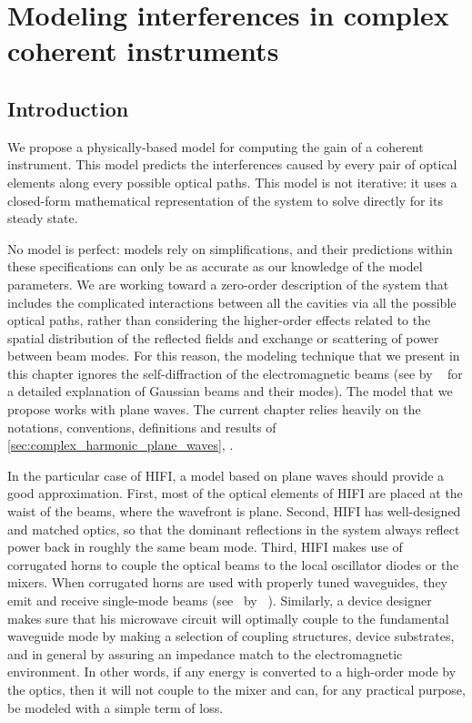 \cleardoublepage
\chapter{Modeling interferences in complex coherent instruments}
\label{sec:chapter2}

\section{Introduction}
\label{sec:chapter2_0}

We propose a physically-based model for computing the gain of a coherent instrument.
This model predicts the interferences caused by every pair of optical elements along every possible optical paths.
This model is not iterative: it uses a closed-form mathematical representation of the system to solve directly for its steady state.

No model is perfect: models rely on simplifications, and their predictions within these specifications can only be as accurate as our knowledge of the model parameters.
We are working toward a zero-order description of the system that includes the complicated interactions between all the cavities via all the possible optical paths, rather than considering the higher-order effects related to the spatial distribution of the reflected fields and exchange or scattering of power between beam modes.
For this reason, the modeling technique that we present in this chapter ignores the self-diffraction of the electromagnetic beams
(see  by \citeauthor{goldsmith1998quasioptical}~\cite{goldsmith1998quasioptical} for a detailed explanation of Gaussian beams and their modes).
The model that we propose works with plane waves.
The current chapter relies heavily on the notations, conventions, definitions and results of
\vref{sec:complex_harmonic_plane_waves}, \textit{}.

In the particular case of HIFI, a model based on plane waves should provide a good approximation.
First, most of the optical elements of HIFI are placed at the waist of the beams, where the wavefront is plane.
Second, HIFI has well-designed and matched optics, so that the dominant reflections in the system always reflect power back in roughly the same beam mode.
Third, HIFI makes use of corrugated horns to couple the optical beams to the local oscillator diodes or the mixers.
When corrugated horns are used with properly tuned waveguides, they emit and receive single-mode beams (see~ by \citeauthor{clarricoats1966propagation}~\cite{clarricoats1966propagation}).
Similarly, a device designer makes sure that his microwave circuit will optimally couple to the fundamental waveguide mode by making a selection of coupling structures, device substrates, and in general by assuring an impedance match to the electromagnetic environment.
In other words, if any energy is converted to a high-order mode by the optics, then it will not couple to the mixer and can, for any practical purpose, be modeled with a simple term of loss.

